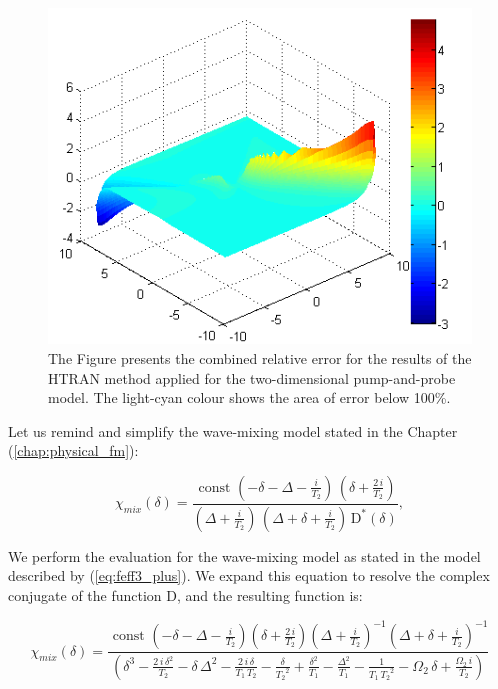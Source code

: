 \documentclass[12pt,twoside,a4paper]{article}
\numberwithin{equation}{subsection}
\numberwithin{figure}{subsection}
\begin{document}
\begin{figure}
  \begin{center}
    \includegraphics{img/htran_pnp_3derr.png}
    \caption{The Figure presents the combined relative error for the results of the HTRAN method applied for the two-dimensional pump-and-probe model. The light-cyan colour shows the area of error below 100\%.  \label{fig:htran_pnp_3derr}}
  \end{center}
\end{figure} %

Let us remind and simplify the wave-mixing model stated in the Chapter (\ref{chap:physical_fm}):

\begin{equation} \label{eq:htran_fm}
	\chi_{mix} (\delta) =
      \frac { \text{ const } ( - \delta - \Delta - \frac{i}{ { T_{2} } } ) \, ( \delta  + \frac{2 \, i} { { T_{2} } } ) }
            { ( \Delta + \frac {i}{ { T_{2} } } ) \, ( \Delta  + \delta  + \frac {i}{ { T_{2} } } ) \, { \mathrm{D} } ^ {*} (\delta) },
\end{equation}

We perform the evaluation for the wave-mixing model as stated in the model described by (\ref{eq:feff3_plus}). We expand this equation to resolve the complex conjugate of the function D, and the resulting function is:

\begin{equation} \label{eq:htran_feffexp}
  \chi_{mix}( \delta ) = 
    \frac{ \text{ const } 
           ( - \delta - \Delta - \frac {i}{ T_{2} } ) 
           ( \delta + \frac{2 \, i}{ T_{2} } ) 
	       ( \Delta + \frac {i}{ T_{2} } ) ^ {-1} 
	       ( \Delta + \delta + \frac {i}{ T_{2} } ) ^ {-1} } 
	     { ( \delta^{3} 
	       - \frac{2 \, i \, \delta^{2} } { T_{2} } 
	       - \delta \,\Delta^{2} 
	       - \frac {2\,i\,\delta } { T_{1}  \, T_{2} } 
	       - \frac{ \delta }{ {T_{2} } ^ {2} } 
	       + \frac { \delta^{2} } { T_{1} } 
	       - \frac { \Delta^{2} } { T_{1} } 
	       - \frac {1}{ { T_{1} } \, {T_{2}}^{2}} 
	       - {\Omega_{2}}\,\delta  
	       + \frac { \Omega_{2} \, i} { T_{2} } ) }
\end{equation}	     
\end{document}
